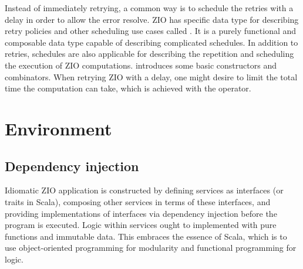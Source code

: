 Instead of immediately retrying, a common way is to schedule the retries with a delay in order to allow the error resolve. ZIO has specific data type for describing retry policies and other scheduling use cases called . It is a purely functional and composable data type capable of describing complicated schedules. In addition to retries, schedules are also applicable for describing the repetition and scheduling the execution of ZIO computations.  introduces some basic  constructors and combinators. When retrying ZIO with a delay, one might desire to limit the total time the computation can take, which is achieved with the  operator.




\section{Environment}





\subsection{Dependency injection}
Idiomatic ZIO application is constructed by defining services as interfaces (or traits in Scala), composing other services in terms of these interfaces, and providing implementations of interfaces via dependency injection before the program is executed. Logic within services ought to implemented with pure functions and immutable data. This embraces the essence of Scala, which is to use object-oriented programming for modularity and functional programming for logic.
% 


